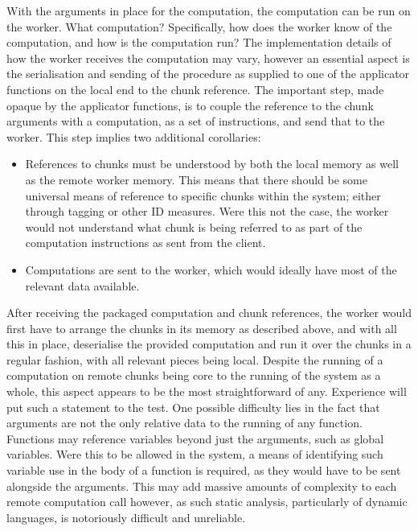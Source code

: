 With the arguments in place for the computation, the computation can be
run on the worker. What computation? Specifically, how does the worker
know of the computation, and how is the computation run? The
implementation details of how the worker receives the computation may
vary, however an essential aspect is the serialisation and sending of
the procedure as supplied to one of the applicator functions on the
local end to the chunk reference. The important step, made opaque by the
applicator functions, is to couple the reference to the chunk arguments
with a computation, as a set of instructions, and send that to the
worker. This step implies two additional corollaries:

\begin{itemize}
    \item
          References to chunks must be understood by both the local memory as
          well as the remote worker memory. This means that there should be some
          universal means of reference to specific chunks within the system;
          either through tagging or other ID measures. Were this not the case,
          the worker would not understand what chunk is being referred to as
          part of the computation instructions as sent from the client.
    \item
          Computations are sent to the worker, which would ideally have most of
          the relevant data available.
\end{itemize}

After receiving the packaged computation and chunk references, the
worker would first have to arrange the chunks in its memory as described
above, and with all this in place, deserialise the provided computation
and run it over the chunks in a regular fashion, with all relevant
pieces being local. Despite the running of a computation on remote
chunks being core to the running of the system as a whole, this aspect
appears to be the most straightforward of any. Experience will put such
a statement to the test. One possible difficulty lies in the fact that
arguments are not the only relative data to the running of any function.
Functions may reference variables beyond just the arguments, such as
global variables. Were this to be allowed in the system, a means of
identifying such variable use in the body of a function is required, as
they would have to be sent alongside the arguments. This may add massive
amounts of complexity to each remote computation call however, as such
static analysis, particularly of dynamic languages, is notoriously
difficult and unreliable.

